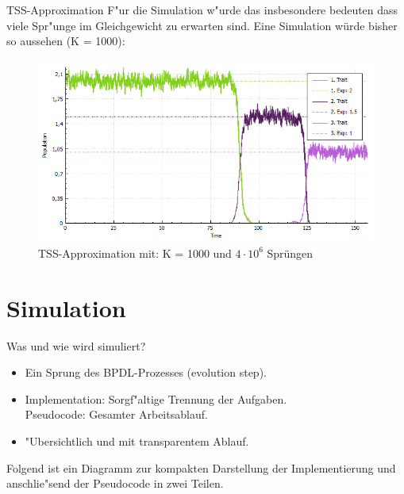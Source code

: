 \documentclass{beamer}
\begin{document}
\begin{frame}{TSS-Approximation}
	F"ur die Simulation w"urde das insbesondere bedeuten dass viele Spr"unge im Gleichgewicht zu erwarten sind.\pause
	Eine Simulation würde bisher so aussehen (K = 1000):
	\begin{figure}[H]
		\centering
		\includegraphics[width=0.8\linewidth]{./Pictures/TSS2_pure_small}
		\caption[TSS Approximation wechselnder Dominanz]{TSS-Approximation mit: K = 1000 und $ 4 \cdot 10^6 $ Sprüngen}
	\end{figure}
\end{frame}

\section{Simulation}
\begin{frame}{Was und wie wird simuliert?}
	\begin{itemize}
		\item Ein Sprung des BPDL-Prozesses (evolution step).
		\item Implementation: Sorgf"altige Trennung der Aufgaben.\\
			Pseudocode: Gesamter Arbeitsablauf.
		\item "Ubersichtlich und mit transparentem Ablauf.\pause
	\end{itemize}
	Folgend ist ein Diagramm zur kompakten Darstellung der Implementierung und anschlie"send der Pseudocode in zwei Teilen.
\end{frame}
\end{document}
